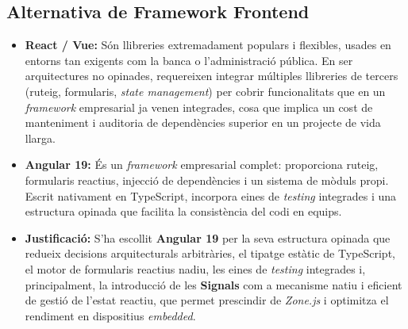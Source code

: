 \subsection{Alternativa de Framework Frontend}
\begin{itemize}
  \item \textbf{React / Vue:} Són llibreries extremadament populars i flexibles, usades en entorns tan exigents com la banca o l'administració pública. En ser arquitectures no opinades, requereixen integrar múltiples llibreries de tercers (ruteig, formularis, \textit{state management}) per cobrir funcionalitats que en un \textit{framework} empresarial ja venen integrades, cosa que implica un cost de manteniment i auditoria de dependències superior en un projecte de vida llarga.
  \item \textbf{Angular 19:} És un \textit{framework} empresarial complet: proporciona ruteig, formularis reactius, injecció de dependències i un sistema de mòduls propi. Escrit nativament en TypeScript, incorpora eines de \textit{testing} integrades i una estructura opinada que facilita la consistència del codi en equips.
  \item \textbf{Justificació:} S'ha escollit \textbf{Angular 19} per la seva estructura opinada que redueix decisions arquitecturals arbitràries, el tipatge estàtic de TypeScript, el motor de formularis reactius nadiu, les eines de \textit{testing} integrades i, principalment, la introducció de les \textbf{Signals} \cite{angular_signals} com a mecanisme natiu i eficient de gestió de l'estat reactiu, que permet prescindir de \textit{Zone.js} i optimitza el rendiment en dispositius \textit{embedded}.
\end{itemize}

